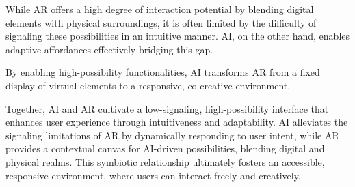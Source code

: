 
While AR offers a high degree of interaction potential by blending digital elements with physical surroundings, it is often limited by the difficulty of signaling these possibilities in an intuitive manner.
AI, on the other hand, enables adaptive affordances effectively bridging this gap.


By enabling high-possibility functionalities, AI transforms AR from a fixed display of virtual elements to a responsive, co-creative environment.

Together, AI and AR cultivate a low-signaling, high-possibility interface that enhances user experience through intuitiveness and adaptability.
AI alleviates the signaling limitations of AR by dynamically responding to user intent, while AR provides a contextual canvas for AI-driven possibilities, blending digital and physical realms.
This symbiotic relationship ultimately fosters an accessible, responsive environment, where users can interact freely and creatively.%

